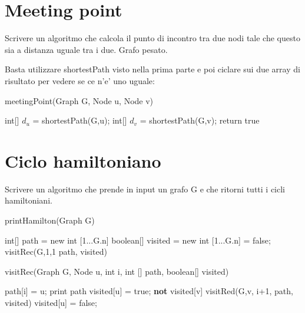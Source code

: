 \documentclass[oneside]{book}
\begin{document}
\section{Meeting point}
Scrivere un algoritmo che calcola il punto di incontro tra due nodi tale che questo sia a distanza uguale tra i due. Grafo pesato.

Basta utilizzare shortestPath visto nella prima parte e poi ciclare sui due array di risultato per vedere se ce n'e' uno uguale:

\begin{algorithm}
\caption{meetingPoint(Graph G, Node u, Node v)\label{cap:alg}}
\begin{algorithmic}
\State int[] $d_u$ = shortestPath(G,u);
\State int[] $d_v$ = shortestPath(G,v);
		\State return true
	\EndIf
\EndFor
\end{algorithmic}
\end{algorithm}
\newpage

\section{Ciclo hamiltoniano}
Scrivere un algoritmo che prende in input un grafo G e che ritorni tutti i cicli hamiltoniani.

\begin{algorithm}
\caption{printHamilton(Graph G)\label{alg:cap}}
\begin{algorithmic}
\State int[] path = new int [1...G.n]
\State boolean[] visited = new int [1...G.n] = false;
\State visitRec(G,1,1 path, visited)
\end{algorithmic}
\end{algorithm}


\begin{algorithm}
\caption{visitRec(Graph G, Node u, int i, int [] path, boolean[] visited)\label{alg:cap}}
\begin{algorithmic}
\State path[i] = u;
		\State print path
	\EndIf
\Else
	\State visited[u] = true;
		\If \textbf{not} visited[v]
			\State visitRed(G,v, i+1, path, visited)
		\EndIf
		\State visited[u] = false;
	\EndFor
\EndIf


\end{algorithmic}
\end{algorithm}
\end{document}
